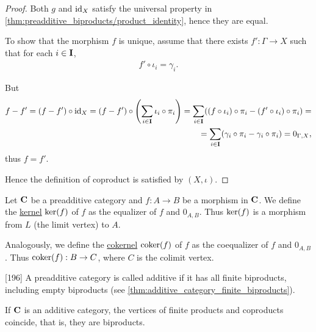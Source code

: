 \begin{proof}
  Both $g$ and $\operatorname{id}_X$ satisfy the universal property in \cref{thm:preadditive_biproducts/product_identity}, hence they are equal.

  To show that the morphism $f$ is unique, assume that there exists $f': \Gamma \to X$ such that for each $i \in \operatorname{\mathbf{I}}$,
  \begin{align*}
    f' \circ \iota_i = \gamma_i.
  \end{align*}

  But
  \begin{align*}
    f - f'
    =
    (f - f') \circ \operatorname{id}_X
    =
    (f - f') \circ \left( \sum_{i \in \operatorname{\mathbf{I}}} \iota_i \circ \pi_i \right)
    =
    \sum_{i \in \operatorname{\mathbf{I}}} ((f \circ \iota_i) \circ \pi_i - (f' \circ \iota_i) \circ \pi_i)
    = \\ =
    \sum_{i \in \operatorname{\mathbf{I}}} (\gamma_i \circ \pi_i - \gamma_i \circ \pi_i)
    =
    0_{\Gamma,X},
  \end{align*}
  thus $f = f'$.

  Hence the definition of coproduct is satisfied by $(X, \iota)$.
\end{proof}

\begin{definition}\label{def:categorical_kernel}
  Let $\operatorname{\mathbf{C}}$ be a preadditive category and $f: A \to B$ be a morphism in $\operatorname{\mathbf{C}}$. We define the \uline{kernel} $\operatorname{ker}(f)$ of $f$ as the equalizer of $f$ and $0_{A,B}$. Thus $\operatorname{ker}(f)$ is a morphism from $L$ (the limit vertex) to $A$.

  Analogously, we define the \uline{cokernel} $\operatorname{coker}(f)$ of $f$ as the coequalizer of $f$ and $0_{A,B}$. Thus $\operatorname{coker}(f): B \to C$, where $C$ is the colimit vertex.
\end{definition}

\begin{definition}\label{def:additive_category}\cite{MacLane1994}[196]
  A preadditive category is called additive if it has all finite biproducts, including empty biproducts (see \cref{thm:additive_category_finite_biproducts}).
\end{definition}

\begin{theorem}\label{thm:additive_category_finite_biproducts}
  If $\operatorname{\mathbf{C}}$ is an additive category, the vertices of finite products and coproducts coincide, that is, they are biproducts.
\end{theorem}

